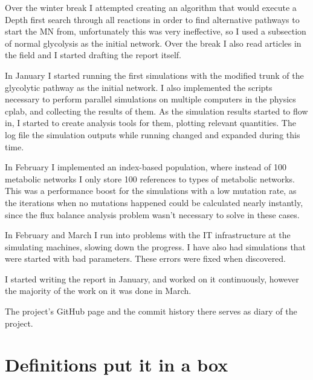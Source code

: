 \documentclass[a4paper,12pt]{article}
\begin{document}
	Over the winter break I attempted creating an algorithm that would execute a Depth first search through all reactions in order to find alternative pathways to start the MN from, unfortunately this was very ineffective, so I used a subsection of normal glycolysis as the initial network. Over the break I also read articles in the field and I started drafting the report itself. 

	In January I started running the first simulations with the modified trunk of the glycolytic pathway as the initial network. I also implemented the scripts necessary to perform parallel simulations on multiple computers in the physics cplab, and collecting the results of them. 
	As the simulation results started to flow in, I started to create analysis tools for them, plotting relevant quantities. The log file the simulation outputs while running changed and expanded during this time. 

	In February I implemented an index-based population, where instead of 100 metabolic networks I only store 100 references to types of metabolic networks. This was a performance boost for the simulations with a low mutation rate, as the iterations when no mutations happened could be calculated nearly instantly, since the flux balance analysis problem wasn't necessary to solve in these cases. 

	In February and March I run into problems with the IT infrastructure at the simulating machines, slowing down the progress. I have also had simulations that were started with bad parameters. These errors were fixed when discovered. 

	I started writing the report in January, and worked on it continuously, however the majority of the work on it was done in March. 

	The project's GitHub page \cite{owngithub} and the commit history there serves as diary of the project. 
	\cleardoublepage
	\section*{Definitions put it in a box}
\end{document}
